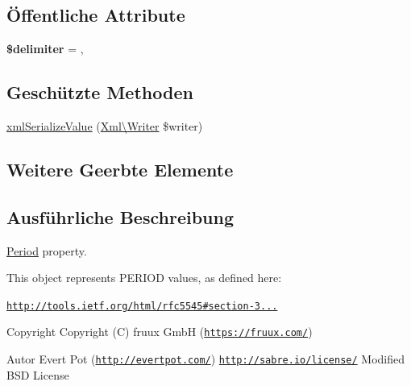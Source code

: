 \subsection*{Öffentliche Attribute}
\begin{DoxyCompactItemize}
\item 
\mbox{\label{class_sabre_1_1_v_object_1_1_property_1_1_i_calendar_1_1_period_af952c876bc460f9464635e8cbcd03ce1}} 
{\bfseries \$delimiter} = \textquotesingle{},\textquotesingle{}
\end{DoxyCompactItemize}
\subsection*{Geschützte Methoden}
\begin{DoxyCompactItemize}
\item 
\mbox{\hyperlink{class_sabre_1_1_v_object_1_1_property_1_1_i_calendar_1_1_period_adcafc98b0a9cf5f4cf298c5948a3ba50}{xml\+Serialize\+Value}} (\mbox{\hyperlink{class_sabre_1_1_xml_1_1_writer}{Xml\textbackslash{}\+Writer}} \$writer)
\end{DoxyCompactItemize}
\subsection*{Weitere Geerbte Elemente}


\subsection{Ausführliche Beschreibung}
\mbox{\hyperlink{class_sabre_1_1_v_object_1_1_property_1_1_i_calendar_1_1_period}{Period}} property.

This object represents P\+E\+R\+I\+OD values, as defined here\+:

\href{http://tools.ietf.org/html/rfc5545#section-3.8.2.6}{\tt http\+://tools.\+ietf.\+org/html/rfc5545\#section-\/3...}

\begin{DoxyCopyright}{Copyright}
Copyright (C) fruux GmbH (\href{https://fruux.com/}{\tt https\+://fruux.\+com/}) 
\end{DoxyCopyright}
\begin{DoxyAuthor}{Autor}
Evert Pot (\href{http://evertpot.com/}{\tt http\+://evertpot.\+com/})  \href{http://sabre.io/license/}{\tt http\+://sabre.\+io/license/} Modified B\+SD License 
\end{DoxyAuthor}


